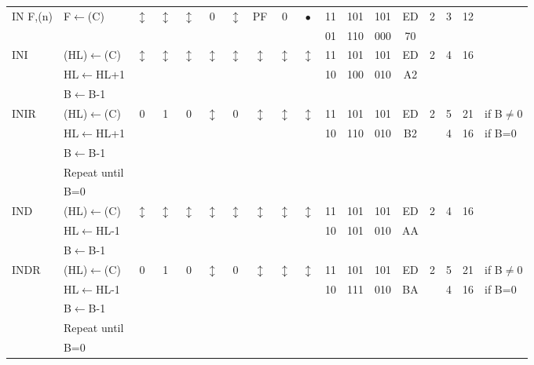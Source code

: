 \documentclass[oneside,a4paper]{book}
\newcommand{\instrt}{\rule{0pt}{2.7ex}}
\newcommand{\instrb}{\rule[-1.7ex]{0pt}{0pt}}
\begin{document}
{\begin{tabular}{llcccccccccccccccl}
		IN F,(n)\instrt & 
			F$\leftarrow$(C) & 
			$\updownarrow$ & 
				$\updownarrow$ & 
				$\updownarrow$ & 
				0 & 
				$\updownarrow$ & 
				PF & 
				0 & 
				$\bullet$ & 
			11 & 101 & 101 & 
			ED & 2 & 
			3 & 12 & \\
			\multicolumn{10}{c}{} & 01 & 110 & 000 & 70 & \instrb \\

		INI\instrt & 
			(HL)$\leftarrow$(C) & 
			$\updownarrow$\footnotemark[1] & 
				$\updownarrow$\footnotemark[1] & 
				$\updownarrow$\footnotemark[1] & 
				$\updownarrow$\footnotemark[3] & 
				$\updownarrow$\footnotemark[1] & 
				$\updownarrow$\footnotemark[3] & 
				$\updownarrow$\footnotemark[2] & 
				$\updownarrow$\footnotemark[3] & 
			11 & 101 & 101 & 
			ED & 2 & 
			4 & 16 & \\
			& HL$\leftarrow$HL+1 & \multicolumn{8}{c}{} & 10 & 100 & 010 & A2 & \\
			& B$\leftarrow$B-1 & \instrb \\

		INIR\instrt & 
			(HL)$\leftarrow$(C) & 
			0 & 
				1 & 
				0 & 
				$\updownarrow$\footnotemark[3] & 
				0 & 
				$\updownarrow$\footnotemark[3] & 
				$\updownarrow$\footnotemark[2] & 
				$\updownarrow$\footnotemark[3] &
			11 & 101 & 101 & 
			ED & 2 & 
			5 & 21 & {if B$\not=$0} \\
			& HL$\leftarrow$HL+1 & \multicolumn{8}{c}{} & 10 & 110 & 010 & B2 & & 4 & 16 & {if B=0} \\
			& B$\leftarrow$B-1 \\
			& Repeat until \\
			& B=0 & \instrb \\

		IND\instrt & 
			(HL)$\leftarrow$(C) & 
			$\updownarrow$\footnotemark[1] & 
				$\updownarrow$\footnotemark[1] & 
				$\updownarrow$\footnotemark[1] & 
				$\updownarrow$\footnotemark[3] & 
				$\updownarrow$\footnotemark[1] & 
				$\updownarrow$\footnotemark[3] & 
				$\updownarrow$\footnotemark[2] & 
				$\updownarrow$\footnotemark[4] & 
			11 & 101 & 101 & 
			ED & 2 & 
			4 & 16 & \\
			& HL$\leftarrow$HL-1 & \multicolumn{8}{c}{} & 10 & 101 & 010 & AA & \\
			& B$\leftarrow$B-1 & \instrb \\

		INDR\instrt & 
			(HL)$\leftarrow$(C) & 
			0 & 
				1 & 
				0 & 
				$\updownarrow$\footnotemark[3] & 
				0 & 
				$\updownarrow$\footnotemark[3] & 
				$\updownarrow$\footnotemark[2] & 
				$\updownarrow$\footnotemark[3] & 
			11 & 101 & 101 & 
			ED & 2 & 
			5 & 21 & {if B$\not=$0} \\
			& HL$\leftarrow$HL-1 & \multicolumn{8}{c}{} & 10 & 111 & 010 & BA &  & 4 & 16 & {if B=0} \\
			& B$\leftarrow$B-1 \\
			& Repeat until \\
			& B=0 & \instrb \\


\end{tabular}}
\end{document}
